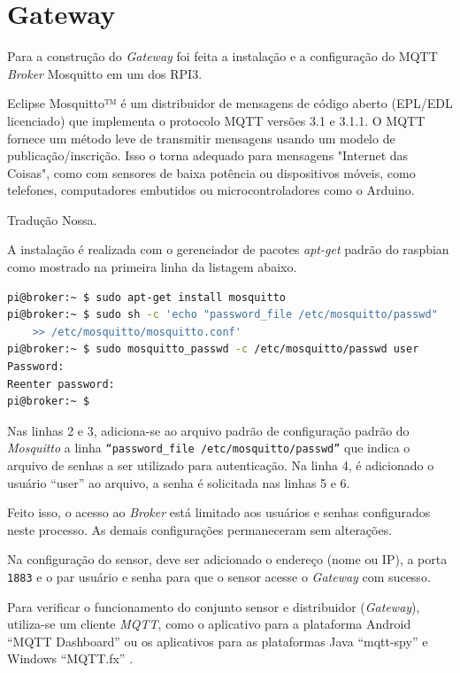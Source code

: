 \section{Gateway}
\label{sec:app-gw}

Para a construção do \emph{Gateway} foi feita a instalação e a configuração do
MQTT \emph{Broker} Mosquitto em um dos RPI3.

\begin{citacao}

	Eclipse Mosquitto™ é um distribuidor de mensagens de código aberto (EPL/EDL
	licenciado) que implementa o protocolo MQTT versões 3.1 e 3.1.1. O MQTT
	fornece um método leve de transmitir mensagens usando um modelo de
	publicação/inscrição. Isso o torna adequado para mensagens "Internet das
	Coisas", como com sensores de baixa potência ou dispositivos móveis, como
	telefones, computadores embutidos ou microcontroladores como o Arduino. \

	 Tradução Nossa.
\end{citacao}


A instalação é realizada com o gerenciador de pacotes \emph{apt-get} padrão do
raspbian como mostrado na primeira linha da listagem abaixo.

\begin{lstlisting}[language=bash,caption={Instalação e configuração do Mosquitto},label=code-mosquitto]
pi@broker:~ $ sudo apt-get install mosquitto
pi@broker:~ $ sudo sh -c 'echo "password_file /etc/mosquitto/passwd"
	>> /etc/mosquitto/mosquitto.conf'
pi@broker:~ $ sudo mosquitto_passwd -c /etc/mosquitto/passwd user
Password:
Reenter password:
pi@broker:~ $
\end{lstlisting}

Nas linhas 2 e 3, adiciona-se ao arquivo padrão de configuração padrão do
\emph{Mosquitto} a linha \texttt{``password\_file /etc/mosquitto/passwd''} que
indica o arquivo de senhas a ser utilizado para autenticação. Na linha 4, é
adicionado o usuário ``user'' ao arquivo, a senha é solicitada  nas
linhas 5 e 6.

Feito isso, o acesso ao \emph{Broker} está limitado aos usuários e senhas
configurados neste processo. As demais configurações permaneceram sem alterações.

Na configuração do sensor, deve ser adicionado o endereço (nome ou IP), a porta
\texttt{1883} e o par usuário e senha para que o sensor acesse o \emph{Gateway} com
sucesso.

Para verificar o funcionamento do conjunto sensor e distribuidor (\emph{Gateway}), utiliza-se um
cliente \emph{MQTT}, como o aplicativo para a plataforma Android ``MQTT Dashboard''
\cite{mqttdash} ou os aplicativos para as plataformas Java ``mqtt-spy''
\cite{mqttspy} e Windows ``MQTT.fx'' \cite{mqttfx}.

